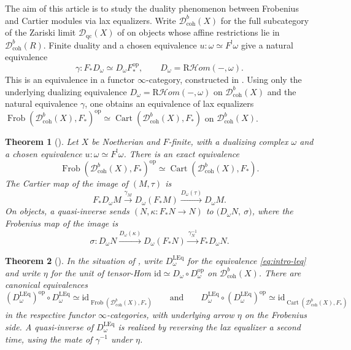 \documentclass[11pt]{amsart}
\newcommand{\Cart}{\operatorname{Cart}}
\newcommand{\op}{{\operatorname{op}}}
\newcommand{\RHom}{\mathrm R\mathcal Hom}
\newcommand{\Frob}{\operatorname{Frob}}
\newcommand{\Dqc}{\mathcal D_{\mathrm{qc}}}
\newcommand{\Dbc}{\mathcal D^b_{\mathrm{coh}}}
\theoremstyle{plain}
\newtheorem{introthm}{Theorem}
\theoremstyle{definition}
\numberwithin{equation}{section}
\begin{document}
The aim of this article is to study the duality phenomenon between Frobenius and Cartier modules via lax equalizers.
Write $\Dbc(X)$ for the full subcategory of the Zariski limit $\Dqc(X)$ of  on objects whose affine restrictions lie in $\mathcal D^b_{\mathrm{coh}}(R)$.
Finite duality and a chosen equivalence $u:\omega\simeq F^!\omega$ give a natural equivalence
\begin{equation}\label{eq:intro-gamma}
 \gamma:F_*D_\omega\simeq
                  D_\omega F_*^{\op},\qquad
 D_\omega=\RHom(-,\omega).
\end{equation}
This is an equivalence in a functor $\infty$-category, constructed in .
Using only the underlying dualizing equivalence $D_\omega=\RHom(-,\omega)$ on $\Dbc(X)$ and the natural equivalence $\gamma$, one obtains an equivalence of lax equalizers $\Frob(\Dbc(X),F_*)^{\op}\simeq\Cart(\Dbc(X),F_*)$ on $\Dbc(X)$.

\begin{introthm}[{}]\label{thm:intro-leq}
Let $X$ be Noetherian and $F$-finite, with a dualizing complex $\omega$ and a chosen equivalence $u:\omega\simeq F^!\omega$.
There is an exact equivalence
\begin{equation}\label{eq:intro-leq}
 \Frob(\Dbc(X),F_*)^{\op}\simeq\Cart(\Dbc(X),F_*).
\end{equation}
The Cartier map of the image of $(M,\tau)$ is
\[
 F_*D_\omega M\xrightarrow{\gamma_M}
 D_\omega(F_*M)\xrightarrow{D_\omega(\tau)}
 D_\omega M.
\]
On objects, a quasi-inverse sends $(N,\kappa:F_*N\to N)$ to $\bigl(D_\omega N,\ \sigma\bigr)$, where the Frobenius map of the image is
\[
 \sigma:
 D_\omega N
 \xrightarrow{D_\omega(\kappa)}
 D_\omega(F_*N)
 \xrightarrow{\gamma_N^{-1}}
 F_*D_\omega N.
\]
\end{introthm}

\begin{introthm}[{}]\label{thm:intro-bidual}
In the situation of , write $D_\omega^{\mathrm{LEq}}$ for the equivalence \eqref{eq:intro-leq} and write $\eta$ for the unit of tensor-Hom $\mathrm{id}\simeq D_\omega\circ D_\omega^{\op}$ on $\Dbc(X)$.
There are canonical equivalences
\[
 (D_\omega^{\mathrm{LEq}})^{\op}\circ D_\omega^{\mathrm{LEq}}
 \simeq
 \mathrm{id}_{\Frob(\Dbc(X),F_*)}
 \qquad\text{and}\qquad
 D_\omega^{\mathrm{LEq}}\circ (D_\omega^{\mathrm{LEq}})^{\op}
 \simeq
 \mathrm{id}_{\Cart(\Dbc(X),F_*)}
\]
in the respective functor $\infty$-categories, with underlying arrow $\eta$ on the Frobenius side.
A quasi-inverse of $D_\omega^{\mathrm{LEq}}$ is realized by reversing the lax equalizer a second time, using the mate of $\gamma^{-1}$ under $\eta$.
\end{introthm}
\end{document}
